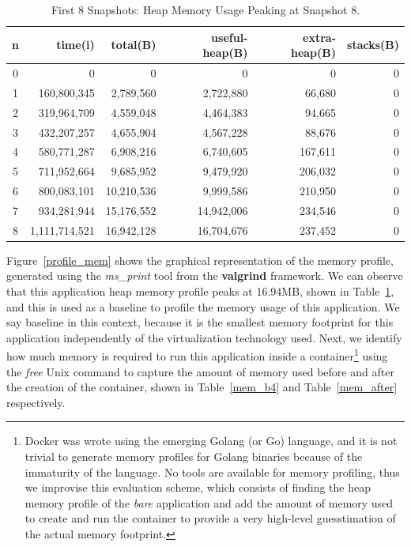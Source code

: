 \documentclass[12pt, titlepage]{uo_temp}
\begin{document}
     \begin{table}[h!]\label{tbl_profile_mem}
       \begin{tabular}{c*{5}{r}}
         n & time(i) & total(B) & useful-heap(B) & extra-heap(B) & stacks(B)\\
         \hline
         \hline
         0 & 0 & 0 & 0 & 0 & 0\\
         1 & 160,800,345 & 2,789,560 & 2,722,880 & 66,680 & 0 \\
         2 & 319,964,709 & 4,559,048 & 4,464,383 & 94,665 & 0 \\
         3 & 432,207,257 & 4,655,904 & 4,567,228 & 88,676 & 0 \\
         4 & 580,771,287 & 6,908,216 & 6,740,605 & 167,611 & 0 \\
         5 & 711,952,664 & 9,685,952 & 9,479,920 & 206,032 & 0 \\
         6 & 800,083,101 & 10,210,536 & 9,999,586 & 210,950 & 0 \\
         7 & 934,281,944 & 15,176,552 & 14,942,006 & 234,546 & 0 \\
         8 & 1,111,714,521 & 16,942,128 & 16,704,676 & 237,452 & 0 \\
         \hline
       \end{tabular}
       \caption{First 8 Snapshots: Heap Memory Usage Peaking at Snapshot 8.} 
     \end{table}
     Figure~\ref{profile_mem} shows the graphical representation of the memory profile,
     generated using the \emph{ms\_print} tool from the \textbf{valgrind} framework. We
     can observe that this application heap memory profile peaks at 16.94MB, shown in
     Table~\ref{tbl_profile_mem}, and this is used as a baseline to profile the memory
     usage of this application. We say baseline in this context, because it is the
     smallest memory footprint for this application independently of the virtualization
     technology used. Next, we identify how much memory is required to run this
     application inside a container\footnote{Docker was wrote using the emerging Golang
       (or Go) language, and it is not trivial to generate memory profiles for Golang
       binaries because of the immaturity of the language. No tools are available for
       memory profiling, thus we improvise this evaluation scheme, which consists of
       finding the heap memory profile of the \emph{bare} application and add the amount
       of memory used to create and run the container to provide a very high-level
       guesstimation of the actual memory footprint.} using the \emph{free} Unix command
     to capture the amount of memory used before and after the creation of the container,
     shown in Table~\ref{mem_b4} and Table~\ref{mem_after} respectively.
\end{document}
